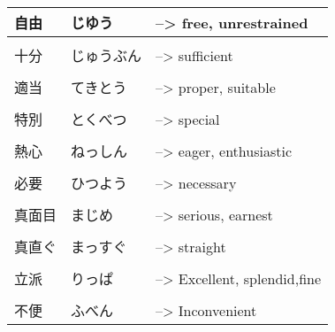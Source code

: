 \documentclass{article}
\begin{document}
\begin{tabular}{ l | l l }
自由&じゆう&--> free, unrestrained\\ \hline\\[-1em]
十分&じゅうぶん&--> sufficient\\ \hline\\[-1em]
適当 	&てきとう&--> proper, suitable\\ \hline\\[-1em]
特別 	&とくべつ &--> special\\ \hline\\[-1em]
熱心 	&ねっしん &--> eager, enthusiastic\\ \hline\\[-1em]
必要 	&ひつよう &--> necessary\\ \hline\\[-1em]
真面目 	&まじめ &--> serious, earnest\\ \hline\\[-1em]
真直ぐ 	&まっすぐ&--> straight\\ \hline\\[-1em]
立派 	&りっぱ &--> Excellent, splendid,fine\\ \hline\\[-1em]
不便 	&ふべん &--> Inconvenient   %
\end{tabular}
\end{document}
